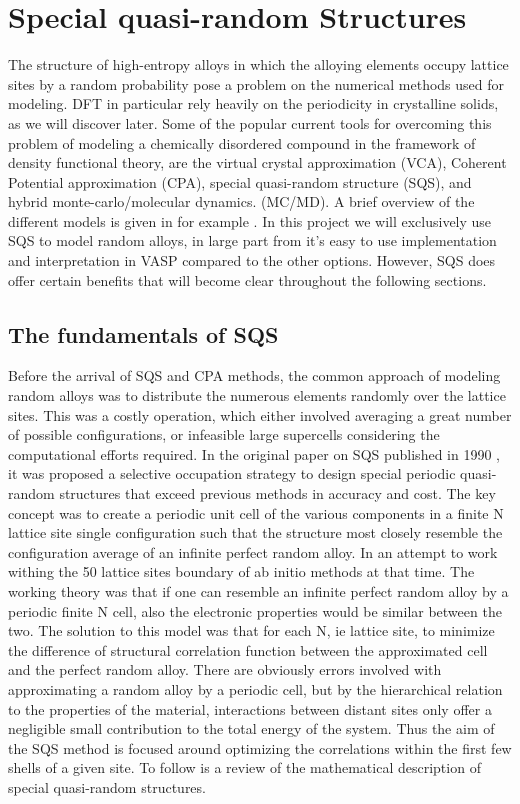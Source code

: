 \chapter{Special quasi-random Structures}
\label{sec:SQS}

The structure of high-entropy alloys in which the alloying elements occupy lattice sites by a random probability pose a problem on the numerical methods used for modeling. DFT in particular rely heavily on the periodicity in crystalline solids, as we will discover later. Some of the popular current tools for overcoming this problem of modeling a chemically disordered compound in the framework of density functional theory, are the virtual crystal approximation (VCA), Coherent Potential approximation (CPA), special quasi-random structure (SQS), and hybrid monte-carlo/molecular dynamics. (MC/MD). A brief overview of the different models is given in for example \cite{sqsIntro}. In this project we will exclusively use SQS to model random alloys, in large part from it's easy to use implementation and interpretation in VASP compared to the other options. However, SQS does offer certain benefits that will become clear throughout the following sections.             

\section{The fundamentals of SQS}
Before the arrival of SQS and CPA methods, the common approach of modeling random alloys was to distribute the numerous elements randomly over the lattice sites. This was a costly operation, which either involved averaging a great number of possible configurations, or infeasible large supercells considering the computational efforts required. In the original paper on SQS published in 1990 \cite{sqsfull}, it was proposed a selective occupation strategy to design special periodic quasi-random structures that exceed previous methods in accuracy and cost. The key concept was to create a periodic unit cell of the various components in a finite N lattice site single configuration such that the structure most closely resemble the configuration average of an infinite perfect random alloy. In an attempt to work withing the 50 lattice sites boundary of ab initio methods at that time. The working theory was that if one can resemble an infinite perfect random alloy by a periodic finite N cell, also the electronic properties would be similar between the two. The solution to this model was that for each N, ie lattice site, to minimize the difference of structural correlation function between the approximated cell and the perfect random alloy. There are obviously errors involved with approximating a random alloy by a periodic cell, but by the hierarchical relation to the properties of the material, interactions between distant sites only offer a negligible small contribution to the total energy of the system. Thus the aim of the SQS method is focused around optimizing the correlations within the first few shells of a given site. To follow is a review of the mathematical description of special quasi-random structures.


